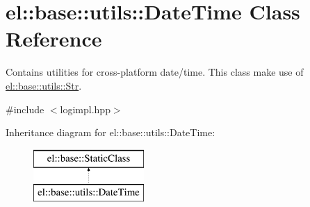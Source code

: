 \hypertarget{classel_1_1base_1_1utils_1_1DateTime}{\section{el\-:\-:base\-:\-:utils\-:\-:Date\-Time Class Reference}
\label{classel_1_1base_1_1utils_1_1DateTime}
}


Contains utilities for cross-\/platform date/time. This class make use of \hyperlink{classel_1_1base_1_1utils_1_1Str}{el\-::base\-::utils\-::\-Str}.  




{\ttfamily \#include $<$logimpl.\-hpp$>$}

Inheritance diagram for el\-:\-:base\-:\-:utils\-:\-:Date\-Time\-:\begin{figure}[H]
\begin{center}
\leavevmode
\includegraphics[height=2.000000cm]{classel_1_1base_1_1utils_1_1DateTime}
\end{center}
\end{figure}
